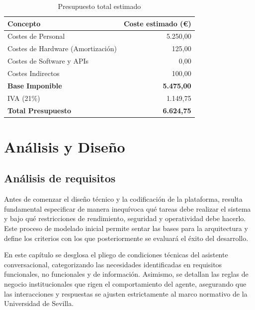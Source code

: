 \documentclass[12pt,a4paper,oneside]{report}
\begin{document}
\begin{table}[H]
    \centering
    \caption{Presupuesto total estimado}
    \begin{tabular}{@{}lr@{}}
        \toprule
        \textbf{Concepto}                 & \textbf{Coste estimado (€)} \\
        \midrule
        Costes de Personal                & 5.250,00                    \\
        Costes de Hardware (Amortización) & 125,00                      \\
        Costes de Software y APIs         & 0,00                        \\
        Costes Indirectos                 & 100,00                      \\
        \midrule
        \textbf{Base Imponible}           & \textbf{5.475,00}           \\
        IVA (21\%)                        & 1.149,75                    \\
        \midrule
        \textbf{Total Presupuesto}        & \textbf{6.624,75}           \\
        \bottomrule
    \end{tabular}
    \label{tab:presupuesto}
\end{table}

\part{Análisis y Diseño}
\chapter{Análisis de requisitos}

Antes de comenzar el diseño técnico y la codificación de la plataforma, resulta fundamental especificar de manera inequívoca qué tareas debe realizar el sistema y bajo qué restricciones de rendimiento, seguridad y operatividad debe hacerlo. Este proceso de modelado inicial permite sentar las bases para la arquitectura y define los criterios con los que posteriormente se evaluará el éxito del desarrollo.

En este capítulo se desglosa el pliego de condiciones técnicas del asistente conversacional, categorizando las necesidades identificadas en requisitos funcionales, no funcionales y de información. Asimismo, se detallan las reglas de negocio institucionales que rigen el comportamiento del agente, asegurando que las interacciones y respuestas se ajusten estrictamente al marco normativo de la Universidad de Sevilla.
\end{document}
